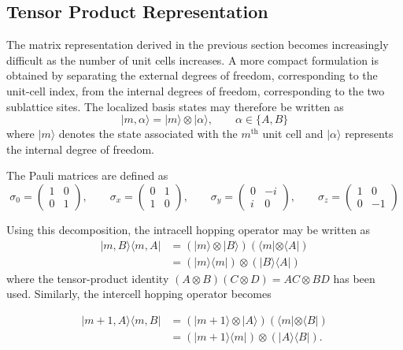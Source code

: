 \documentclass[11pt, a4paper]{article}
\begin{document}
\subsection{Tensor Product Representation}
The matrix representation derived in the previous section becomes increasingly difficult as the number of unit cells increases.
A more compact formulation is obtained by separating the external degrees of freedom, corresponding to the unit-cell index, from the internal degrees of freedom, corresponding to the two sublattice sites.
The localized basis states may therefore be written as~\cite{asboth2015}
\begin{equation*}
    |m,\alpha\rangle = |m\rangle \otimes |\alpha\rangle, \qquad \alpha \in \{A,B\}
\end{equation*} 
where $|m\rangle$ denotes the state associated with the $m^\text{th}$ unit cell and $|\alpha\rangle$ represents the internal degree of freedom.

The Pauli matrices are defined as
\begin{equation*}
    \sigma_0=
\begin{pmatrix}
1&0\\
0&1
\end{pmatrix},
\qquad
\sigma_x=
\begin{pmatrix}
0&1\\
1&0
\end{pmatrix},
\qquad
\sigma_y=
\begin{pmatrix}
0&-i\\
i&0
\end{pmatrix},
\qquad
\sigma_z=
\begin{pmatrix}
1&0\\
0&-1
\end{pmatrix}
\end{equation*}

Using this decomposition, the intracell hopping operator may be written as
\begin{align*}
    |m,B\rangle\langle m,A| &= \left( |m\rangle \otimes |B\rangle\right) \left( \langle m| \otimes \langle A| \right)\\
    &= \left(|m\rangle \langle m| \right) \otimes \left(|B\rangle \langle A| \right)
\end{align*}
where the tensor-product identity $(A\otimes B)(C \otimes D) = AC\otimes BD$ has been used.
Similarly, the intercell hopping operator becomes

\begin{align*}
|m+1,A\rangle\langle m,B|
&=
\left(|m+1\rangle\otimes|A\rangle\right)
\left(\langle m|\otimes\langle B|\right)\\
&=
\left(|m+1\rangle\langle m|\right)
\otimes
\left(|A\rangle\langle B|\right).
\end{align*}
\end{document}
